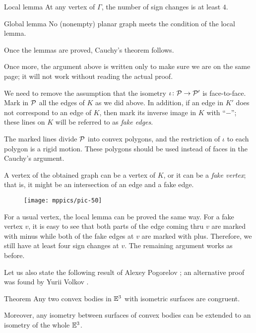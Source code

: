 \begin{thm}{Local lemma}
At any vertex of $\Gamma$, the number of sign changes is at least $4$.
\end{thm}

\begin{thm}{Global lemma}
No (nonempty) planar graph meets the condition of the local lemma.
\end{thm}

Once the lemmas are proved, Cauchy's theorem follows.
\qeds

Once more, the argument above is  written only to make sure we are on the same page;
it will not work without reading the actual proof.

We need to remove the assumption that the isometry $\iota\colon\mathcal{P}\to \mathcal{P}'$ is face-to-face.
Mark in $\mathcal{P}$ all the edges of $K$ as we did above.
In addition, if an edge in $K'$ does not correspond to an edge of $K$, then mark its inverse image in $K$   with ``$-$''; these lines on $K$ will be referred to as \emph{fake edges}.

The marked lines divide $\mathcal{P}$ into convex polygons, and the restriction of $\iota$ to each polygon is a rigid motion.
These polygons should be used instead of faces in the Cauchy's argument.

A vertex of the obtained graph can be a vertex of $K$, or it can be a {}\emph{fake vertex};
that is, it might be an intersection of an edge and a fake edge.

\begin{figure}[ht!]
\vskip-0mm
\centering
\texttt{[image: mppics/pic-50]}
\vskip-0mm
\end{figure}

For a usual vertex, the local lemma can be proved the same way.
For a fake vertex $v$, it is easy to see that both parts of the edge coming thru $v$ are marked with minus
while both of the fake edges at $v$ are marked with plus.
Therefore, we still have at least four sign changes at $v$.
The remaining argument works as before.
\qeds

Let us also state the following result of Alexey Pogorelov \cite[chapter III]{pogorelov};
an alternative proof was found by Yurii Volkov \cite{volkov1968}.

\begin{thm}{Theorem}
Any two convex bodies in $\mathbb{E}^3$ with isometric surfaces are congruent.

Moreover, any isometry between surfaces of convex bodies can be extended to an isometry of the whole $\mathbb{E}^3$.
\end{thm}

